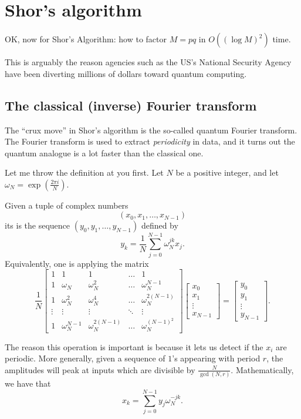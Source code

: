 \chapter{Shor's algorithm}
OK, now for Shor's Algorithm:
how to factor $M = pq$ in $O\left( (\log M)^2 \right)$ time.

This is arguably the reason agencies such as the US's National
Security Agency have been diverting millions of dollars toward
quantum computing.

\section{The classical (inverse) Fourier transform}
The ``crux move'' in Shor's algorithm is the so-called
quantum Fourier transform.
The Fourier transform is used to extract \emph{periodicity} in data,
and it turns out the quantum analogue is a lot faster than the classical one.

Let me throw the definition at you first.
Let $N$ be a positive integer, and let $\omega_N = \exp\left( \frac{2\pi i}{N} \right)$.
\begin{definition}
	Given a tuple of complex numbers
	\[ \left( x_0, x_1, \dots, x_{N-1} \right) \]
	its  is
	the sequence $(y_0, y_1, \dots, y_{N-1})$ defined by
	\[ y_k = \frac1N \sum_{j=0}^{N-1} \omega_N^{jk} x_j. \]
	Equivalently, one is applying the matrix
	\[
		\frac 1N
		\begin{bmatrix}
			1 & 1 & 1 & \dots & 1 \\
			1 & \omega_N & \omega_N^2 & \dots & \omega_N^{N-1} \\
			1 & \omega_N^2 & \omega_N^4 & \dots & \omega_N^{2(N-1)} \\
			\vdots & \vdots & \vdots & \ddots & \vdots \\
			1 & \omega_N^{N-1} & \omega_N^{2(N-1)} & \dots & \omega_N^{(N-1)^2}
		\end{bmatrix}
		\begin{bmatrix} x_0 \\ x_1 \\ \vdots \\ x_{N-1} \end{bmatrix}
		=
		\begin{bmatrix} y_0 \\ y_1 \\ \vdots \\ y_{N-1} \end{bmatrix}.
	\]
\end{definition}
The reason this operation is important is because it lets
us detect if the $x_i$ are periodic.
More generally, given a sequence of $1$'s appearing with period $r$,
the amplitudes will peak at inputs which are divisible by $\frac{N}{\gcd(N,r)}$.
Mathematically, we have that
\[
	x_k = \sum_{j=0}^{N-1} y_j \omega_N^{-jk}.
\]

